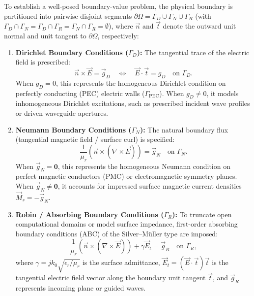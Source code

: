 \documentclass[VANCOUVER,Times1COL]{WileyNJD-v5}
\begin{document}
To establish a well-posed boundary-value problem, the physical boundary is partitioned into pairwise disjoint segments $\partial\Omega = \Gamma_D \cup \Gamma_N \cup \Gamma_R$ (with $\Gamma_D \cap \Gamma_N = \Gamma_D \cap \Gamma_R = \Gamma_N \cap \Gamma_R = \emptyset$), where $\vec{n}$ and $\vec{t}$ denote the outward unit normal and unit tangent to $\partial\Omega$, respectively:
\begin{enumerate}
    \item \textbf{Dirichlet Boundary Conditions ($\Gamma_D$):} The tangential trace of the electric field is prescribed:
          \begin{equation}
              \vec{n} \times \vec{E} = \vec{g}_D \quad \iff \quad \vec{E} \cdot \vec{t} = g_D \quad \text{on } \Gamma_D.
              \label{eq:pec_bc}
          \end{equation}
          When $g_D = 0$, this represents the homogeneous Dirichlet condition on perfectly conducting (PEC) electric walls ($\Gamma_{\mathrm{PEC}}$). When $g_D \ne 0$, it models inhomogeneous Dirichlet excitations, such as prescribed incident wave profiles or driven waveguide apertures.
    \item \textbf{Neumann Boundary Conditions ($\Gamma_N$):} The natural boundary flux (tangential magnetic field / surface curl) is specified:
          \begin{equation}
              \frac{1}{\mu_r} \left(\vec{n} \times (\nabla \times \vec{E})\right) = \vec{g}_N \quad \text{on } \Gamma_N.
              \label{eq:neumann_bvp_pde}
          \end{equation}
          When $\vec{g}_N = \mathbf{0}$, this represents the homogeneous Neumann condition on perfect magnetic conductors (PMC) or electromagnetic symmetry planes. When $\vec{g}_N \ne \mathbf{0}$, it accounts for impressed surface magnetic current densities $\vec{M}_s = -\vec{g}_N$.
    \item \textbf{Robin / Absorbing Boundary Conditions ($\Gamma_R$):} To truncate open computational domains or model surface impedance, first-order absorbing boundary conditions (ABC) of the Silver--M{\"u}ller type are imposed:
          \begin{equation}
              \frac{1}{\mu_r} \left(\vec{n} \times (\nabla \times \vec{E})\right) + \gamma \vec{E}_t = \vec{g}_R \quad \text{on } \Gamma_R,
              \label{eq:robin_bvp_pde}
          \end{equation}
          where $\gamma = j k_0 \sqrt{\epsilon_r / \mu_r}$ is the surface admittance, $\vec{E}_t = (\vec{E} \cdot \vec{t})\vec{t}$ is the tangential electric field vector along the boundary unit tangent $\vec{t}$, and $\vec{g}_R$ represents incoming plane or guided waves.
\end{enumerate}
\end{document}
